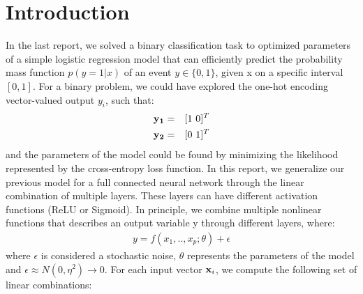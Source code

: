 \documentclass{article}
\begin{document}
\section{Introduction}
In the last report, we solved a binary classification task to optimized parameters of a simple logistic regression model that can efficiently predict the probability mass function $p(y = 1 | x)$ of an event $y \in \{0,1\}$, given x on a specific interval $[0,1]$.  For a binary problem, we could have explored the one-hot encoding vector-valued output $y_i$, such that:
\begin{eqnarray}
\bf{y}_1&=&[1~0]^T \nonumber \\
\bf{y}_2&=&[0~1]^T
\end{eqnarray}
and the parameters of the model could be found by minimizing the likelihood represented by the cross-entropy loss function. In this report, we generalize our previous model for a full connected neural network through the linear combination of multiple layers. These layers can have different activation functions (ReLU or Sigmoid). In principle, we combine multiple nonlinear functions that describes an output variable y through different layers, where:
\begin{eqnarray}
y = f(x_1,..,x_p;\theta) + \epsilon
\end{eqnarray}
where $\epsilon$ is considered a stochastic noise, $\theta$ represents the parameters of the model and $\epsilon \approx N(0, \eta^2) \rightarrow 0$. For each input vector $\bold{x}_i $, we compute the following set of linear combinations:
\end{document}
